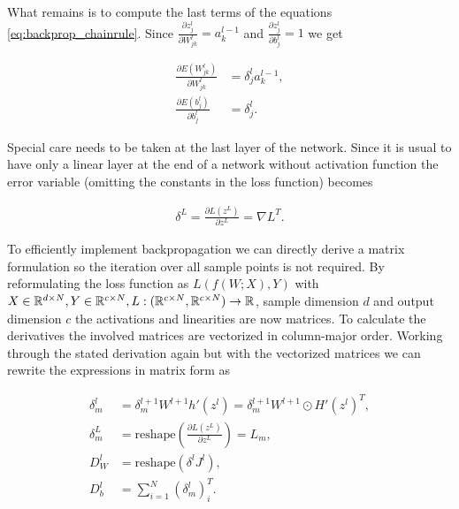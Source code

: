 \documentclass[english,11pt,a4paper]{article}
\begin{document}
What remains is to compute the last terms of the equations \ref{eq:backprop_chainrule}. Since $\frac{\partial z^l_j}{\partial W^l_{jk}} = a^{l-1}_k$ and $\frac{\partial z^l_j}{\partial b_j^l} = 1$ we get

\begin{equation}
	\begin{aligned}
		\frac{\partial E(W_{jk}^l)}{\partial W_{jk}^l} &= \delta^l_j a^{l-1}_k, \\
		\frac{\partial E(b_j^l)}{\partial b_j^l} &= \delta^l_j.
	\end{aligned}
\end{equation}

Special care needs to be taken at the last layer of the network. Since it is usual to have only a linear layer at the end of a network without activation function the error variable (omitting the constants in the loss function) becomes 

\begin{equation}
	\begin{aligned}
		\delta^L = \frac{\partial L(z^L)}{\partial z^L} = \nabla L^T.
	\end{aligned}
\end{equation}

To efficiently implement backpropagation we can directly derive a matrix formulation so the iteration over all sample points is not required. By reformulating the loss function as $L(f(W;X),Y)$ with $X \in \mathbb{R}^{d \times N}, Y \in \mathbb{R}^{c \times N}, L: (\mathbb{R}^{c \times N},\mathbb{R}^{c \times N}) \to \mathbb{R}$, sample dimension $d$ and output dimension $c$ the activations and linearities are now matrices. To calculate the derivatives the involved matrices are vectorized in column-major order. Working through the stated derivation again but with the vectorized matrices we can rewrite the expressions in matrix form as

\begin{equation}
	\begin{aligned}
		\delta^l_m &= \delta^{l+1}_m W^{l+1} h'(z^l) = \delta^{l+1}_m W^{l+1} \odot H'(z^l)^T, \\
		\delta^L_m &= \text{reshape}(\frac{\partial L(z^L)}{\partial z^L}) = L_m, \\
		D_W^l &= \text{reshape}(\delta^l J^l), \\
		D_b^l &= \sum_{i=1}^{N} (\delta^l_m)_{i}^T.
	\end{aligned}
\end{equation}
\end{document}
